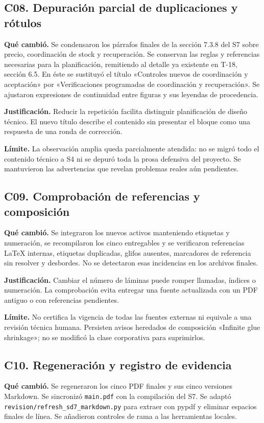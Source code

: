 \documentclass[11pt,letterpaper]{article}
\newcommand{\ruta}[1]{\nolinkurl{#1}}
\begin{document}
\subsection{C08. Depuración parcial de duplicaciones y rótulos}
\textbf{Qué cambió.} Se condensaron los párrafos finales de la sección 7.3.8 del
S7 sobre precio, coordinación de stock y recuperación. Se conservan las reglas
y referencias necesarias para la planificación, remitiendo al detalle ya
existente en T-18, sección 6.5. En éste se sustituyó el título «Controles nuevos
de coordinación y aceptación» por «Verificaciones programadas de coordinación
y recuperación». Se ajustaron expresiones de continuidad entre figuras y sus
leyendas de procedencia.

\textbf{Justificación.} Reducir la repetición facilita distinguir planificación
de diseño técnico. El nuevo título describe el contenido sin presentar el bloque
como una respuesta de una ronda de corrección.

\textbf{Límite.} La observación amplia queda parcialmente atendida: no se migró
todo el contenido técnico a S4 ni se depuró toda la prosa defensiva del proyecto.
Se mantuvieron las advertencias que revelan problemas reales aún pendientes.

\subsection{C09. Comprobación de referencias y composición}
\textbf{Qué cambió.} Se integraron los nuevos activos manteniendo etiquetas y
numeración, se recompilaron los cinco entregables y se verificaron referencias
LaTeX internas, etiquetas duplicadas, glifos ausentes, marcadores de referencia
sin resolver y desbordes. No se detectaron esas incidencias en los archivos finales.

\textbf{Justificación.} Cambiar el número de láminas puede romper llamadas,
índices o numeración. La comprobación evita entregar una fuente actualizada con
un PDF antiguo o con referencias pendientes.

\textbf{Límite.} No certifica la vigencia de todas las fuentes externas ni
equivale a una revisión técnica humana. Persisten avisos heredados de composición
«Infinite glue shrinkage»; no se modificó la clase corporativa para suprimirlos.

\subsection{C10. Regeneración y registro de evidencia}
\textbf{Qué cambió.} Se regeneraron los cinco PDF finales y sus cinco versiones
Markdown. Se sincronizó \ruta{main.pdf} con la compilación del S7. Se adaptó
\ruta{revision/refresh_sd7_markdown.py} para extraer con pypdf y eliminar espacios
finales de línea. Se añadieron controles de rama a las herramientas locales.
\end{document}

